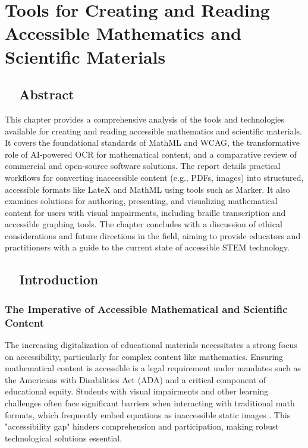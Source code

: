 \chapter{Tools for Creating and Reading Accessible Mathematics and Scientific Materials}\label{ch11:accessible-math}
\raggedright

\section{~~Abstract}\label{ch11:sec:abstract}
This chapter provides a comprehensive analysis of the tools and technologies available for creating and reading accessible mathematics and scientific materials. It covers the foundational standards of \gls{MathML} and \gls{WCAG}, the transformative role of \gls{AI}-powered \gls{OCR} for mathematical content, and a comparative review of commercial and open-source software solutions. The report details practical workflows for converting inaccessible content (e.g., PDFs, images) into structured, accessible formats like \gls{LateX} and \gls{MathML} using tools such as Marker. It also examines solutions for authoring, presenting, and visualizing mathematical content for users with visual impairments, including braille transcription and accessible graphing tools. The chapter concludes with a discussion of ethical considerations and future directions in the field, aiming to provide educators and practitioners with a guide to the current state of accessible STEM technology.

\section{~~Introduction}\label{ch11:sec:introduction}
\subsection{The Imperative of Accessible Mathematical and Scientific Content}\label{ch11:ssec:imperative}
The increasing digitalization of educational materials necessitates a strong focus on accessibility, particularly for complex content like mathematics. Ensuring mathematical content is accessible is a legal requirement under mandates such as the Americans with Disabilities Act (ADA) and a critical component of educational equity. Students with visual impairments and other learning challenges often face significant barriers when interacting with traditional math formats, which frequently embed equations as inaccessible static images \supercite{UWAccessibleMath, ChallengesForVisuallyImpairedUsers}. This "accessibility gap" hinders comprehension and participation, making robust technological solutions essential.

